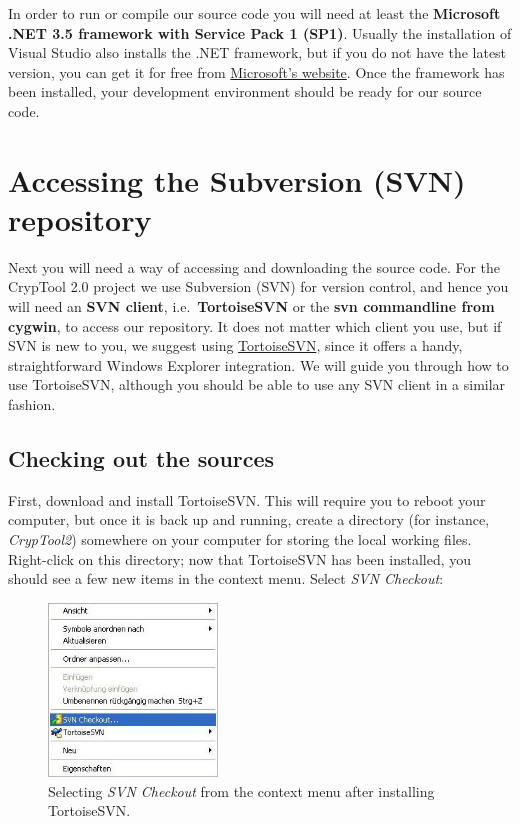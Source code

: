 In order to run or compile our source code you will need at least the \textbf{Microsoft .NET 3.5 framework with Service Pack 1 (SP1)}. Usually the installation of Visual Studio also installs the .NET framework, but if you do not have the latest version, you can get it for free from \href{http://download.microsoft.com/download/0/6/1/061F001C-8752-4600-A198-53214C69B51F/dotnetfx35setup.exe}{Microsoft's website}. Once the framework has been installed, your development environment should be ready for our source code.
\clearpage

\section{Accessing the Subversion (SVN) repository}
\label{AccessingSubversion}

Next you will need a way of accessing and downloading the source code. For the CrypTool 2.0 project we use Subversion (SVN) for version control, and hence you will need an \textbf{SVN client}, i.e.\ \textbf{TortoiseSVN} or the \textbf{svn commandline from cygwin}, to access our repository. It does not matter which client you use, but if SVN is new to you, we suggest using \href{http://www.tortoisesvn.net/}{TortoiseSVN}, since it offers a handy, straightforward Windows Explorer integration. We will guide you through how to use TortoiseSVN, although you should be able to use any SVN client in a similar fashion.

\subsection{Checking out the sources}
\label{CheckingOutTheSources}

First, download and install TortoiseSVN. This will require you to reboot your computer, but once it is back up and running, create a directory (for instance, \textit{CrypTool2}) somewhere on your computer for storing the local working files. Right-click on this directory; now that TortoiseSVN has been installed, you should see a few new items in the context menu. Select \textit{SVN Checkout}:

\begin{figure}[h!]
	\centering
		\includegraphics[width=0.40\textwidth]{figures/tortoise_svn_checkout.jpg}
	\caption{Selecting \textit{SVN Checkout} from the context menu after installing TortoiseSVN.}
	\label{fig:tortoise_svn_checkout}
\end{figure}
\clearpage

